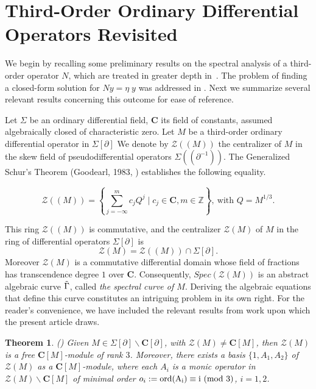 \documentclass[a4paper,12pt]{article}
\newcommand{\cZ}{\mathcal{Z}}
\newcommand{\bbZ}{\mathbb{Z}}
\newcommand{\coC}{\mathbf{C}}
\def\ord{\rm ord}
\def\ord{\rm ord}
\newtheorem{thm}{Theorem}[section]
\begin{document}
\section{Third-Order Ordinary Differential Operators Revisited}\label{sec-Order-3}
We begin by recalling some preliminary results on the spectral analysis of a  third-order operator $N$, which are treated in greater depth in~\cite{RZ2024}. The problem of finding a closed-form solution for $Ny =\eta \; y$ was addressed in  \cite{RZ2024}. Next we summarize several relevant results concerning this outcome for ease of reference. 

\medskip


Let $\Sigma$ be an ordinary differential field, $\coC$ its field of constants, assumed algebraically closed of characteristic zero. Let $M$ be a third-order ordinary differential operator  in $\Sigma [\partial ]$ We denote by $\cZ ((M)) $ the centralizer of $M$ in the skew field of pseudodifferential operators $\Sigma ((\partial^{-1}))$. The {Generalized Schur's Theorem} (Goodearl, 1983, \cite{Good}) establishes the following equality.

\[\cZ ((M))=\left\{\sum_{j=-\infty}^m c_j Q^j\mid c_j\in \coC, m\in\bbZ\right\}, \ \textrm{with } Q=M^{1/3}.\]

This ring  $\cZ ((M))$ is commutative, and the centralizer  $\cZ (M)$ of $M$ in the ring of differential operators $\Sigma [\partial]$ is    
\[\cZ(M)=\cZ ((M))\cap \Sigma[\partial] .
\]
Moreover $\cZ(M)$ is a commutative differential domain whose field of fractions has transcendence degree $1$ over $\coC$. Consequently, {$Spec(\cZ(M))$} is an abstract {algebraic curve $\Tilde{\Gamma}$}, called {\it the spectral curve of $M$}. Deriving the algebraic equations that define this curve constitutes an intriguing problem in its own right. For the reader's convenience, we have included the relevant results from work \cite{RZ2024} upon which the present article draws.






\begin{thm}\label{thm-Gooddearl-forOrder3} (\cite{RZ2024})
 Given $M\in \Sigma[\partial]\backslash \coC[\partial]$, with $\cZ(M)\neq \coC[M]$, then  $\cZ(M)$ is a free $\coC [M]$-module of rank $3$. Moreover, there exists a basis $\{1,A_1,A_2\}$  of $\cZ(M)$ as a $\coC [M]$-module, where each $A_i$ is a monic operator in $\cZ(M)\backslash \coC[M]$ of minimal order 
$o_i:=\ord(A_i)\equiv i\ (mod\ 3 )$, $  i=1, 2$.
\end{thm}
\end{document}
